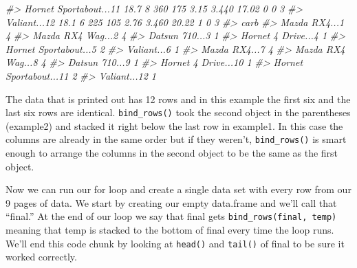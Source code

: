 \documentclass[
]{krantz}
\makeatletter
\newenvironment{Shaded}{\begin{snugshade}}{\end{snugshade}}
\newcommand{\CommentTok}[1]{\textcolor[rgb]{0.37,0.37,0.37}{\textit{#1}}}
\newenvironment{kframe}{%
\medskip{}
\setlength{\fboxsep}{.8em}
 \def\at@end@of@kframe{}%
 \ifinner\ifhmode%
  \def\at@end@of@kframe{\end{minipage}}%
  \begin{minipage}{\columnwidth}%
 \fi\fi%
 \def\FrameCommand##1{\hskip\@totalleftmargin \hskip-\fboxsep
 \colorbox{shadecolor}{##1}\hskip-\fboxsep
     \hskip-\linewidth \hskip-\@totalleftmargin \hskip\columnwidth}%
 \MakeFramed {\advance\hsize-\width
   \@totalleftmargin\z@ \linewidth\hsize
   \@setminipage}}%
 {\par\unskip\endMakeFramed%
 \at@end@of@kframe}
\renewenvironment{Shaded}{\begin{kframe}}{\end{kframe}}
\makeatother
\begin{document}
\begin{Shaded}
\begin{Highlighting}[]
\CommentTok{\#\textgreater{} Hornet Sportabout...11 18.7   8  360 175 3.15 3.440 17.02  0  0    3}
\CommentTok{\#\textgreater{} Valiant...12           18.1   6  225 105 2.76 3.460 20.22  1  0    3}
\CommentTok{\#\textgreater{}                        carb}
\CommentTok{\#\textgreater{} Mazda RX4...1             4}
\CommentTok{\#\textgreater{} Mazda RX4 Wag...2         4}
\CommentTok{\#\textgreater{} Datsun 710...3            1}
\CommentTok{\#\textgreater{} Hornet 4 Drive...4        1}
\CommentTok{\#\textgreater{} Hornet Sportabout...5     2}
\CommentTok{\#\textgreater{} Valiant...6               1}
\CommentTok{\#\textgreater{} Mazda RX4...7             4}
\CommentTok{\#\textgreater{} Mazda RX4 Wag...8         4}
\CommentTok{\#\textgreater{} Datsun 710...9            1}
\CommentTok{\#\textgreater{} Hornet 4 Drive...10       1}
\CommentTok{\#\textgreater{} Hornet Sportabout...11    2}
\CommentTok{\#\textgreater{} Valiant...12              1}
\end{Highlighting}
\end{Shaded}

The data that is printed out has 12 rows and in this example the first six and the last six rows are identical. \texttt{bind\_rows()} took the second object in the parentheses (example2) and stacked it right below the last row in example1. In this case the columns are already in the same order but if they weren't, \texttt{bind\_rows()} is smart enough to arrange the columns in the second object to be the same as the first object.

Now we can run our for loop and create a single data set with every row from our 9 pages of data. We start by creating our empty data.frame and we'll call that ``final.'' At the end of our loop we say that final gets \texttt{bind\_rows(final,\ temp)} meaning that temp is stacked to the bottom of final every time the loop runs. We'll end this code chunk by looking at \texttt{head()} and \texttt{tail()} of final to be sure it worked correctly.
\end{document}
